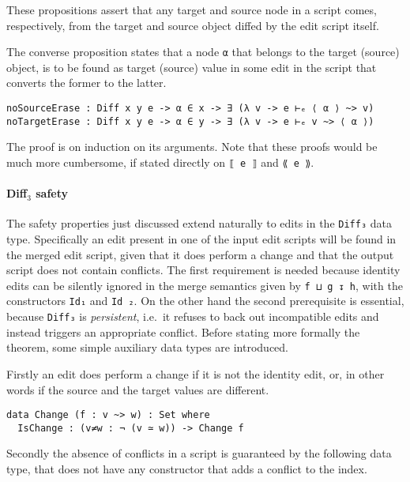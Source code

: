 \documentclass[../Thesis.tex]{subfiles}
\begin{document}
	These propositions assert that any target and
	source node in a script comes, respectively, from the target and
	source object diffed by the edit script itself.
	
	The converse proposition states that a node \texttt{α} that belongs
	to the target (source) object, is to be found as target (source) value 
	in some edit in the script that converts the former to the latter.

\begin{verbatim}
noSourceErase : Diff x y e -> α ∈ x -> ∃ (λ v -> e ⊢ₑ ⟨ α ⟩ ~> v)
noTargetErase : Diff x y e -> α ∈ y -> ∃ (λ v -> e ⊢ₑ v ~> ⟨ α ⟩) 
\end{verbatim}

	The proof is on induction on its arguments. Note that these proofs
	would be much more cumbersome, if stated directly 
	on \texttt{⟦ e ⟧} and \texttt{⟪ e ⟫}.
	
	\paragraph{Diff$_3$ safety}
	\label{par:diff3-safety}
	The safety properties just discussed extend naturally to edits in the 
	\texttt{Diff₃} data type. Specifically an edit present in one of the input
	edit scripts will be found in the merged edit script, given that it does
	perform a change and that the output script does not contain conflicts.
	The first requirement is needed because identity edits can be silently 
	ignored in the merge semantics given by \texttt{f ⊔ g ↧ h}, with the
	constructors \texttt{Id₁} and \texttt{Id	₂}.
	On the other hand the second prerequisite is essential, because 
	\texttt{Diff₃} is \emph{persistent},
	i.e.\ it refuses to back out incompatible edits and instead triggers 
	an appropriate conflict.
	Before stating more formally the theorem, some simple auxiliary 
	data	types are introduced.

	Firstly an edit does perform a change if it is not the identity edit, or, in 
	other words	if the source and the target values are different.

\begin{verbatim}
data Change (f : v ~> w) : Set where
  IsChange : (v≠w : ¬ (v ≃ w)) -> Change f
\end{verbatim}

	Secondly the absence of conflicts in a script is guaranteed by 
	the following data type, that does not have any constructor that adds
	a conflict to the index.
\end{document}
